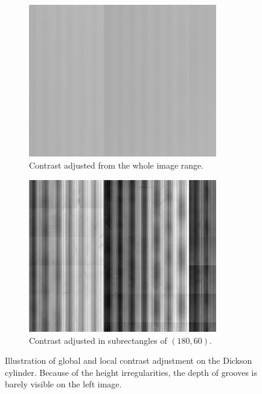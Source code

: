 \begin{figure}[!ht]
    \begin{subfigure}[t]{0.49\textwidth}
    \centering
    \includegraphics[width=0.9\textwidth]{images/contrast-global}
    \caption{Contrast adjusted from the whole image range.}
    \label{fig:contrastlocal}
    \end{subfigure}
    \begin{subfigure}[t]{0.49\textwidth}
    \centering
    \includegraphics[width=0.9\textwidth]{images/contrast-local}
    \caption{Contrast adjusted in subrectangles of $(180,60)$.}
    \label{fig:contrastglobal}
    \end{subfigure}
    \caption[Illustration of global and local contrast adjustment on the Dickson cylinder.]
    {Illustration of global and local contrast adjustment on the Dickson cylinder. Because of the height irregularities, the depth of grooves is barely visible on the left image.}
    \label{fig:contrastimage}
\end{figure}

